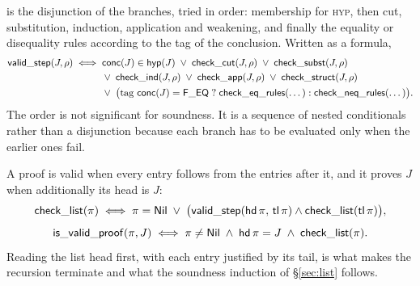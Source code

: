 \noindent
{} is the disjunction of the branches, tried in order:
membership for \textsc{hyp}, then cut, substitution, induction, application and
weakening, and finally the equality or disequality rules according to the tag
of the conclusion.  Written as a formula,
\begin{align*}
\mathsf{valid\_step}(J, \rho) \;\Longleftrightarrow\;\;
& \mathsf{conc}(J) \in \mathsf{hyp}(J)
  \;\vee\; \mathsf{check\_cut}(J, \rho)
  \;\vee\; \mathsf{check\_subst}(J, \rho)\\
&\vee\; \mathsf{check\_ind}(J, \rho)
  \;\vee\; \mathsf{check\_app}(J, \rho)
  \;\vee\; \mathsf{check\_struct}(J, \rho)\\
&\vee\; \bigl(\text{tag } \mathsf{conc}(J) = \mathsf{F\_EQ}
   \;?\; \mathsf{check\_eq\_rules}(\dots) : \mathsf{check\_neq\_rules}(\dots)\bigr).
\end{align*}
The order is not significant for soundness.  It is a sequence of nested
conditionals rather than a disjunction because each branch has to be evaluated
only when the earlier ones fail.


\noindent
A proof is valid when every entry follows from the entries after it, and it
proves $J$ when additionally its head is $J$:
\[
\mathsf{check\_list}(\pi) \;\Longleftrightarrow\;
\pi = \mathsf{Nil} \;\vee\;
\bigl(\mathsf{valid\_step}(\mathsf{hd}\,\pi,\, \mathsf{tl}\,\pi) \wedge \mathsf{check\_list}(\mathsf{tl}\,\pi)\bigr),
\]
\[
\mathsf{is\_valid\_proof}(\pi, J) \;\Longleftrightarrow\;
\pi \neq \mathsf{Nil} \;\wedge\; \mathsf{hd}\,\pi = J \;\wedge\; \mathsf{check\_list}(\pi).
\]
Reading the list head first, with each entry justified by its tail, is what
makes the recursion terminate and what the soundness induction of
\S\ref{sec:list} follows.
